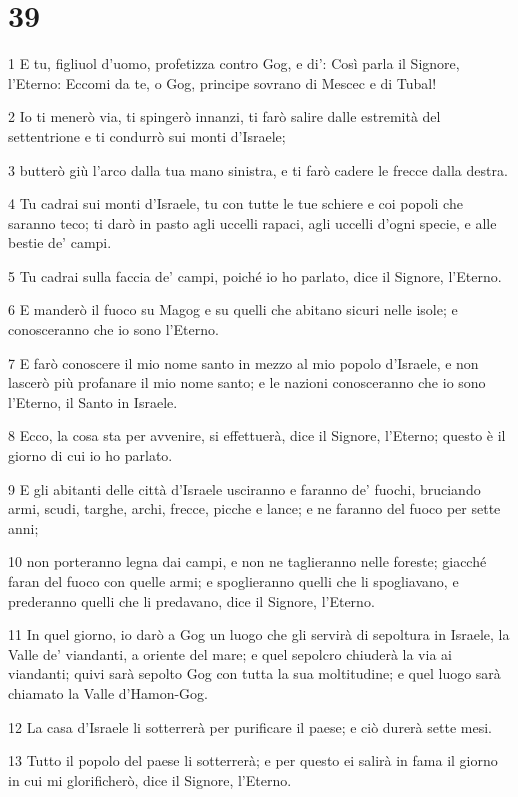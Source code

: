 \chapter{39}

\par 1 E tu, figliuol d'uomo, profetizza contro Gog, e di': Così parla il Signore, l'Eterno: Eccomi da te, o Gog, principe sovrano di Mescec e di Tubal!
\par 2 Io ti menerò via, ti spingerò innanzi, ti farò salire dalle estremità del settentrione e ti condurrò sui monti d'Israele;
\par 3 butterò giù l'arco dalla tua mano sinistra, e ti farò cadere le frecce dalla destra.
\par 4 Tu cadrai sui monti d'Israele, tu con tutte le tue schiere e coi popoli che saranno teco; ti darò in pasto agli uccelli rapaci, agli uccelli d'ogni specie, e alle bestie de' campi.
\par 5 Tu cadrai sulla faccia de' campi, poiché io ho parlato, dice il Signore, l'Eterno.
\par 6 E manderò il fuoco su Magog e su quelli che abitano sicuri nelle isole; e conosceranno che io sono l'Eterno.
\par 7 E farò conoscere il mio nome santo in mezzo al mio popolo d'Israele, e non lascerò più profanare il mio nome santo; e le nazioni conosceranno che io sono l'Eterno, il Santo in Israele.
\par 8 Ecco, la cosa sta per avvenire, si effettuerà, dice il Signore, l'Eterno; questo è il giorno di cui io ho parlato.
\par 9 E gli abitanti delle città d'Israele usciranno e faranno de' fuochi, bruciando armi, scudi, targhe, archi, frecce, picche e lance; e ne faranno del fuoco per sette anni;
\par 10 non porteranno legna dai campi, e non ne taglieranno nelle foreste; giacché faran del fuoco con quelle armi; e spoglieranno quelli che li spogliavano, e prederanno quelli che li predavano, dice il Signore, l'Eterno.
\par 11 In quel giorno, io darò a Gog un luogo che gli servirà di sepoltura in Israele, la Valle de' viandanti, a oriente del mare; e quel sepolcro chiuderà la via ai viandanti; quivi sarà sepolto Gog con tutta la sua moltitudine; e quel luogo sarà chiamato la Valle d'Hamon-Gog.
\par 12 La casa d'Israele li sotterrerà per purificare il paese; e ciò durerà sette mesi.
\par 13 Tutto il popolo del paese li sotterrerà; e per questo ei salirà in fama il giorno in cui mi glorificherò, dice il Signore, l'Eterno.
